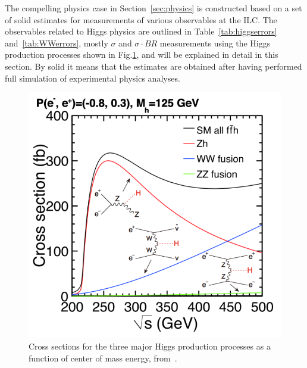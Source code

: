 

% 

% 

% 

The compelling physics case in Section~\ref{sec:physics} is constructed 
based on a set of solid estimates for measurements of various observables at the ILC. 
The observables related to Higgs physics are outlined in Table~\ref{tab:higgserrors} 
and~\ref{tab:WWerrors}, mostly $\sigma$ and $\sigma\cdot BR$ measurements
using the Higgs production processes shown in Fig.\ref{fig:HiggsProdILC},
 and will be explained in detail in this section. 
By solid it means that the estimates are obtained after having performed
full simulation of experimental physics analyses. 

\begin{figure}
\begin{center}
\includegraphics[width=0.85\hsize]{chapters/figures/xsec_h_ILC_left.pdf}
\end{center}
\caption{Cross sections for the three major Higgs production processes
  as a function of 
center of mass energy, 
from~\cite{Baer:2013cma}.}
\label{fig:HiggsProdILC}
\end{figure}

